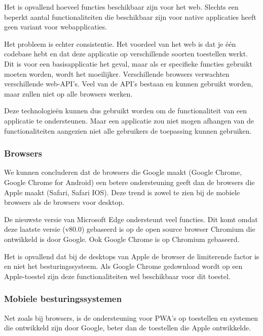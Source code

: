 	Het is opvallend hoeveel functies beschikbaar zijn voor het web. Slechts een beperkt aantal functionaliteiten die beschikbaar zijn voor native applicaties heeft geen variant voor webapplicaties.
	
	Het probleem is echter consistentie. Het voordeel van het web is dat je één codebase hebt en dat deze applicatie op verschillende soorten toestellen werkt. Dit is voor een basisapplicatie het geval, maar als er specifieke functies gebruikt moeten worden, wordt het moeilijker. Verschillende browsers verwachten verschillende web-API’s. Veel van de API's bestaan en kunnen gebruikt worden, maar zullen niet op alle browsers werken.
	
	Deze technologieën kunnen dus gebruikt worden om de functionaliteit van een applicatie te ondersteunen. Maar een applicatie zou niet mogen afhangen van de functionaliteiten aangezien niet alle gebruikers de toepassing kunnen gebruiken.
	


\subsubsection{Browsers}

	We kunnen concluderen dat de browsers die Google maakt (Google Chrome, Google Chrome for Android) een betere ondersteuning geeft dan de browsers die Apple maakt (Safari, Safari IOS). Deze trend is zowel te zien bij de mobiele browsers als de browsers voor desktop.
	
	De nieuwste versie van Microsoft Edge ondersteunt veel functies. Dit komt omdat deze laatste versie (v80.0) gebaseerd is op de open source browser Chromium die ontwikkeld is door Google. Ook Google Chrome is op Chromium gebaseerd.
	
	Het is opvallend dat bij de desktops van Apple de browser de limiterende factor is en niet het besturingssysteem. Als Google Chrome gedownload wordt op een Apple-toestel zijn deze functionaliteiten wel beschikbaar voor dit toestel.
	
	

\subsubsection{Mobiele besturingssystemen }

	Net zoals bij browsers, is de ondersteuning voor PWA's op toestellen en systemen die ontwikkeld zijn door Google, beter dan de toestellen die Apple ontwikkelde.
	

